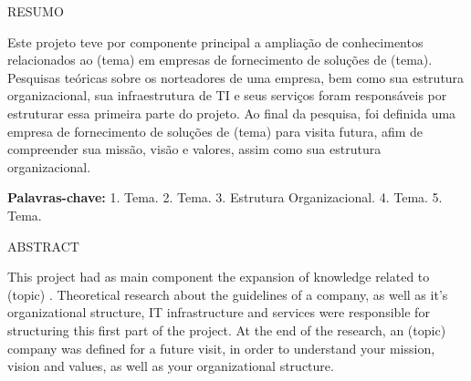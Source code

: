 \documentclass[a4paper,10pt,titlepage]{article}
\begin{document}
\begin{center}
    \begin{Large}
        RESUMO
    \end{Large}
\end{center}

\begin{onehalfspacing}
    \begin{justify}
        \begin{large}
            Este projeto teve por componente principal a ampliação de conhecimentos relacionados ao (tema) em empresas de fornecimento de soluções de (tema). Pesquisas teóricas sobre os norteadores de uma empresa, bem como sua estrutura organizacional, sua infraestrutura de TI e seus serviços foram responsáveis por estruturar essa primeira parte do projeto. Ao final da pesquisa, foi definida uma empresa de fornecimento de soluções de (tema) para visita futura, afim de compreender sua missão, visão e valores, assim como sua estrutura organizacional.
        \end{large}
    \end{justify}
\end{onehalfspacing}
    
\begin{onehalfspacing}
    \begin{justify}
        \begin{large}
            \textbf{Palavras-chave:} 1. Tema. 2. Tema. 3. Estrutura Organizacional. 4. Tema. 5. Tema.
            \end{large}
        \end{justify}
\end{onehalfspacing}\pagebreak

\begin{center}
    \begin{Large}
        ABSTRACT
    \end{Large}
\end{center}

\begin{onehalfspacing}    
    \begin{justify}
        \begin{large}
            This project had as main component the expansion of knowledge related to (topic) . Theoretical research about the guidelines of a company, as well as it's organizational structure, IT infrastructure and services were responsible for structuring this first part of the project. At the end of the research, an (topic) company was defined for a future visit, in order to understand your mission, vision and values, as well as your organizational structure.
        \end{large}
    \end{justify}
\end{onehalfspacing}
    
\end{document}

